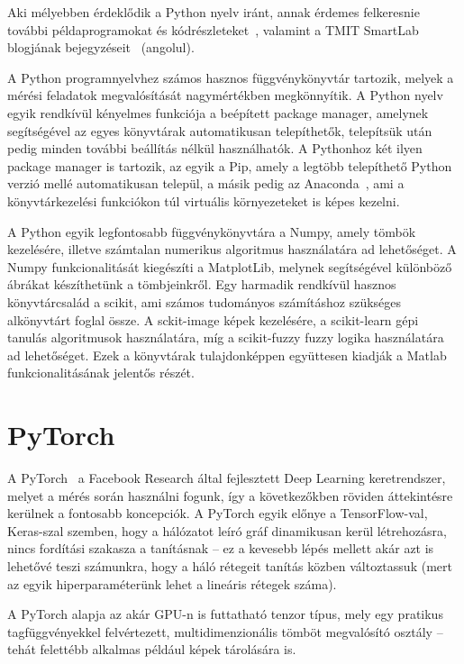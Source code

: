 \documentclass[12pt,a4paper,oneside]{report}             %
\begin{document}
Aki mélyebben érdeklődik a Python nyelv iránt, annak érdemes felkeresnie további példaprogramokat és kódrészleteket~\cite{gist}, valamint a TMIT SmartLab blogjának bejegyzéseit~\cite{smart1,smart2} (angolul). 

A Python programnyelvhez számos hasznos függvénykönyvtár tartozik, melyek a mérési feladatok megvalósítását nagymértékben megkönnyítik. A Python nyelv egyik rendkívül kényelmes funkciója a beépített package manager, amelynek segítségével az egyes könyvtárak automatikusan telepíthetők, telepítsük után pedig minden további beállítás nélkül használhatók. A Pythonhoz két ilyen package manager is tartozik, az egyik a Pip, amely a legtöbb telepíthető Python verzió mellé automatikusan települ, a másik pedig az Anaconda~\cite{conda}, ami a könyvtárkezelési funkciókon túl virtuális környezeteket is képes kezelni.

A Python egyik legfontosabb függvénykönyvtára a Numpy, amely tömbök kezelésére, illetve számtalan numerikus algoritmus használatára ad lehetőséget. A Numpy funkcionalitását kiegészíti a MatplotLib, melynek segítségével különböző ábrákat készíthetünk a tömbjeinkről. Egy harmadik rendkívül hasznos könyvtárcsalád a scikit, ami számos tudományos számításhoz szükséges alkönyvtárt foglal össze. A sckit-image képek kezelésére, a scikit-learn gépi tanulás algoritmusok használatára, míg a scikit-fuzzy fuzzy logika használatára ad lehetőséget. Ezek a könyvtárak tulajdonképpen együttesen kiadják a Matlab funkcionalitásának jelentős részét.

\section{PyTorch}

A PyTorch~\cite{torchDoc,torchTut} a Facebook Research által fejlesztett Deep Learning keretrendszer, melyet a mérés során használni fogunk, így a következőkben röviden áttekintésre kerülnek a fontosabb koncepciók. A PyTorch egyik előnye a TensorFlow-val, Keras-szal szemben, hogy a hálózatot leíró gráf dinamikusan kerül létrehozásra, nincs fordítási szakasza a tanításnak – ez a kevesebb lépés mellett akár azt is lehetővé teszi számunkra, hogy a háló rétegeit tanítás közben változtassuk (mert az egyik hiperparaméterünk lehet a lineáris rétegek száma).

A PyTorch alapja az akár GPU-n is futtatható tenzor típus, mely egy pratikus tagfüggvényekkel felvértezett, multidimenzionális tömböt megvalósító osztály – tehát felettébb alkalmas például képek tárolására is.
\end{document}
